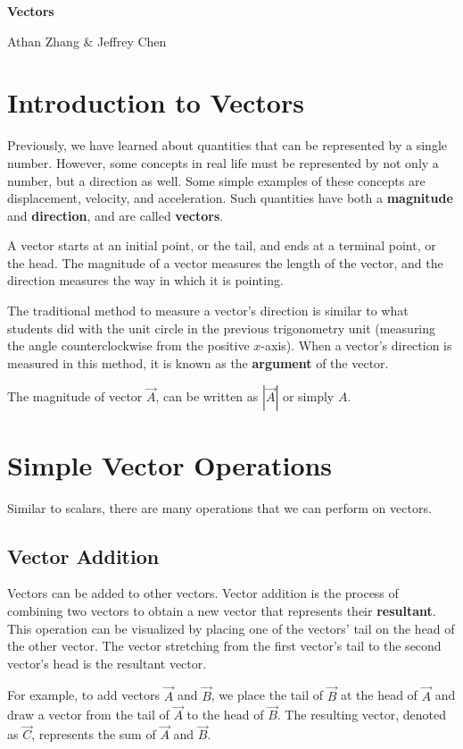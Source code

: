 \documentclass[11pt]{article}
\begin{document}
\textbf{\Huge Vectors}

Athan Zhang \& Jeffrey Chen

\section{Introduction to Vectors}

Previously, we have learned about quantities that can be represented by a single number. However, some concepts in real life must be represented by not only a number, but a direction as well. Some simple examples of these concepts are displacement, velocity, and acceleration. Such quantities have both a \textbf{magnitude} and \textbf{direction}, and are called \textbf{vectors}. 

A vector starts at an initial point, or the tail, and ends at a terminal point, or the head. The magnitude of a vector measures the length of the vector, and the direction measures the way in which it is pointing. 

The traditional method to measure a vector's direction is similar to what students did with the unit circle in the previous trigonometry unit (measuring the angle counterclockwise from the positive $x$-axis). When a vector's direction is measured in this method, it is known as the \textbf{argument} of the vector.

The magnitude of vector \(\Vec{A}\), can be written as $|\Vec{A}|$ or simply $A$.

\section{Simple Vector Operations}

Similar to scalars, there are many operations that we can perform on vectors.

\subsection{Vector Addition}
Vectors can be added to other vectors. Vector addition is the process of combining two vectors to obtain a new vector that represents their \textbf{resultant}. This operation can be visualized by placing one of the vectors' tail on the head of the other vector. The vector stretching from the first vector's tail to the second vector's head is the resultant vector. 

For example, to add vectors \(\Vec{A}\) and \(\Vec{B}\), we place the tail of \(\Vec{B}\) at the head of \(\Vec{A}\) and draw a vector from the tail of \(\Vec{A}\) to the head of \(\Vec{B}\). The resulting vector, denoted as \(\Vec{C}\), represents the sum of \(\Vec{A}\) and \(\Vec{B}\). 
\end{document}
